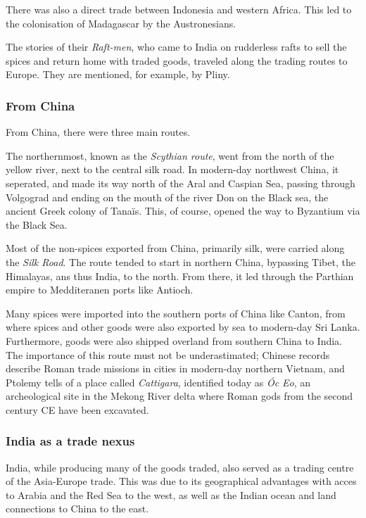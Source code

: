 \documentclass[11pt, a4paper, headings=standardclasses]{scrartcl}
\begin{document}
There was also a direct trade between Indonesia and western Africa. This led to the colonisation of Madagascar by the Austronesians.\autocite{Madagascar}

The stories of their \emph{Raft-men}, who came to India on rudderless rafts to sell the spices and return home with traded goods, traveled along the trading routes to Europe. They are mentioned, for example, by Pliny.\autocite[Chapter 8]{Rome}

\subsubsection{From China}

From China, there were three main routes.

The northernmost, known as the \emph{Scythian route}, went from the north of the yellow river, next to the central silk road. In modern-day northwest China, it seperated, and made its way north of the Aral and Caspian Sea, passing through Volgograd and ending on the mouth of the river Don on the Black sea, the ancient Greek colony of Tana\"{i}s. This, of course, opened the way to Byzantium via the Black Sea.\autocite[149]{Rome}

Most of the non-spices exported from China, primarily silk, were carried along the \emph{Silk Road}. The route tended to start in northern China, bypassing Tibet, the Himalayas, ans thus India, to the north. From there, it led through the Parthian empire\autocite{SilkRome} to Medditeranen ports like Antioch.\autocite[Chapter 7, Maps 2 and 3]{Rome}

Many spices were imported into the southern ports of China like Canton, from where spices and other goods were also exported by sea to modern-day Sri Lanka. Furthermore, goods were also shipped overland from southern China to India.\autocite[Maps 4 and 5]{Rome} The importance of this route must not be underastimated; Chinese records describe Roman trade missions in cities in modern-day northern Vietnam\autocite{curtin_1984}, and Ptolemy tells of a place called \emph{Cattigara}, identified today as \emph{\'{O}c Eo}, an archeological site in the Mekong River delta where Roman gods from the second century CE have been excavated.\autocite{OcEo}

\subsubsection{India as a trade nexus}
India, while producing many of the goods traded, also served as a trading centre of the Asia-Europe trade. This was due to its geographical advantages with acces to Arabia and the Red Sea to the west, as well as the Indian ocean and land connections to China to the east.
\end{document}
